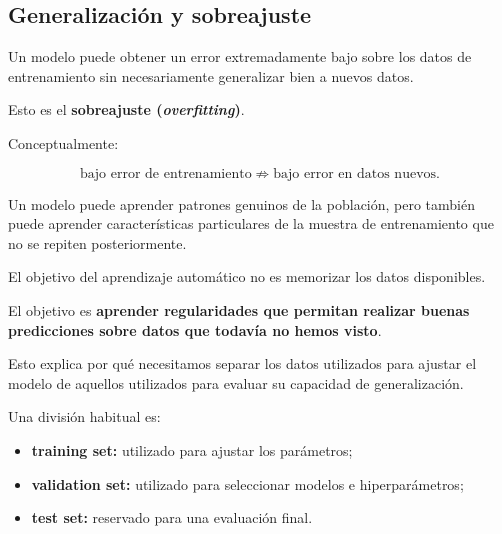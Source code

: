 \documentclass[
  letterpaper,
  DIV=11,
  numbers=noendperiod]{scrartcl}
\providecommand{\tightlist}{%
  \setlength{\itemsep}{0pt}\setlength{\parskip}{0pt}}
\begin{document}
\subsection{Generalización y
sobreajuste}\label{generalizaciuxf3n-y-sobreajuste}

Un modelo puede obtener un error extremadamente bajo sobre los datos de
entrenamiento sin necesariamente generalizar bien a nuevos datos.

Esto es el \textbf{sobreajuste (\emph{overfitting})}.

Conceptualmente:

\[
\text{bajo error de entrenamiento}
\not\Rightarrow
\text{bajo error en datos nuevos}.
\]

Un modelo puede aprender patrones genuinos de la población, pero también
puede aprender características particulares de la muestra de
entrenamiento que no se repiten posteriormente.

\begin{tcolorbox}[enhanced jigsaw, arc=.35mm, bottomrule=.15mm, bottomtitle=1mm, breakable, colback=white, colbacktitle=quarto-callout-important-color!10!white, colframe=quarto-callout-important-color-frame, coltitle=black, left=2mm, leftrule=.75mm, opacityback=0, opacitybacktitle=0.6, rightrule=.15mm, title=\textcolor{quarto-callout-important-color}{\faExclamation}\hspace{0.5em}{Idea central}, titlerule=0mm, toprule=.15mm, toptitle=1mm]

El objetivo del aprendizaje automático no es memorizar los datos
disponibles.

El objetivo es \textbf{aprender regularidades que permitan realizar
buenas predicciones sobre datos que todavía no hemos visto}.

\end{tcolorbox}

Esto explica por qué necesitamos separar los datos utilizados para
ajustar el modelo de aquellos utilizados para evaluar su capacidad de
generalización.

Una división habitual es:

\begin{itemize}
\tightlist
\item
  \textbf{training set:} utilizado para ajustar los parámetros;
\item
  \textbf{validation set:} utilizado para seleccionar modelos e
  hiperparámetros;
\item
  \textbf{test set:} reservado para una evaluación final.
\end{itemize}
\end{document}
